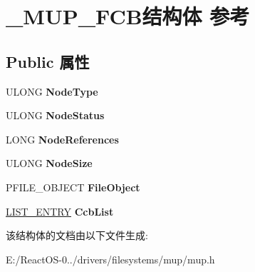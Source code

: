 \hypertarget{struct___m_u_p___f_c_b}{}\section{\+\_\+\+M\+U\+P\+\_\+\+F\+C\+B结构体 参考}
\label{struct___m_u_p___f_c_b}
\subsection*{Public 属性}
\begin{DoxyCompactItemize}
\item 
\mbox{\label{struct___m_u_p___f_c_b_a2e39602ab27670b31b05f98694a27176}} 
U\+L\+O\+NG {\bfseries Node\+Type}
\item 
\mbox{\label{struct___m_u_p___f_c_b_ac1a06de3d1cf9d7fc4f05b56a1eae364}} 
U\+L\+O\+NG {\bfseries Node\+Status}
\item 
\mbox{\label{struct___m_u_p___f_c_b_a374affaa96d541c0cee6e156a29902bd}} 
L\+O\+NG {\bfseries Node\+References}
\item 
\mbox{\label{struct___m_u_p___f_c_b_a539bdbe4a2452290eb6935a3bad2b6ac}} 
U\+L\+O\+NG {\bfseries Node\+Size}
\item 
\mbox{\label{struct___m_u_p___f_c_b_ab16ac35f64839602435413cfb96cf9c7}} 
P\+F\+I\+L\+E\+\_\+\+O\+B\+J\+E\+CT {\bfseries File\+Object}
\item 
\mbox{\label{struct___m_u_p___f_c_b_ae6fdf95e1d8264a9d6d200e9a9df90ca}} 
\hyperlink{struct___l_i_s_t___e_n_t_r_y}{L\+I\+S\+T\+\_\+\+E\+N\+T\+RY} {\bfseries Ccb\+List}
\end{DoxyCompactItemize}


该结构体的文档由以下文件生成\+:\begin{DoxyCompactItemize}
\item 
E\+:/\+React\+O\+S-\/0../drivers/filesystems/mup/mup.\+h\end{DoxyCompactItemize}
